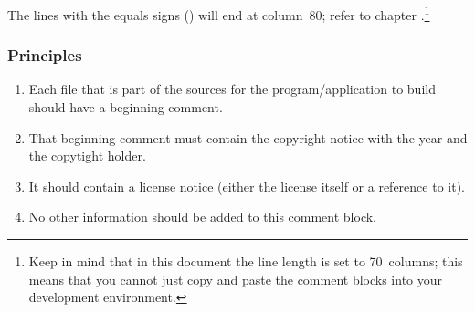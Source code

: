 The lines with the equals signs (\bdq{\texttt{===}}) will end at column~80; refer to chapter .\footnote{Keep in mind that in this document the line length is set to 70~columns; this means that you cannot just copy and paste the comment blocks into your development environment.}

\subsubsection{Principles}
\begin{enumerate}[label=P\arabic*.]
\item{Each file that is part of the sources for the program/application to build should have a beginning comment.}
\item{That beginning comment must contain the copyright notice with the year and the copytight holder.}
\item{It should contain a license notice (either the license itself or a reference to it).}
\item{No other information should be added to this comment block.}
\end{enumerate}

